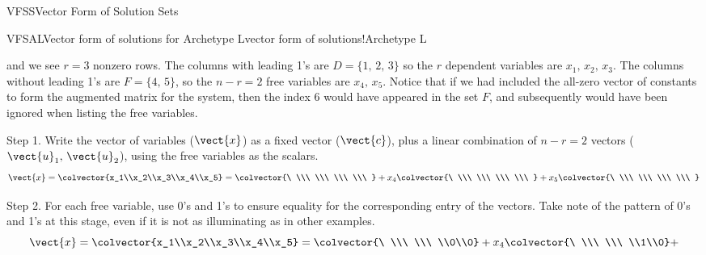\begin{subsect}{VFSS}{Vector Form of Solution Sets}
\begin{example}{VFSAL}{Vector form of solutions for Archetype L}{vector form of solutions!Archetype L}
\begin{para}
\begin{equation*}
\end{equation*}
%
and we see $r=3$ nonzero rows.  The columns with leading 1's are $D=\{1,\,2,\,3\}$ so the $r$ dependent variables are $x_1,\,x_2,\,x_3$.  The columns without leading 1's are $F=\{4,\,5\}$, so the $n-r=2$ free variables are $x_4,\,x_5$.  Notice that if we had included the all-zero vector of constants to form the augmented matrix for the system, then the index 6 would have appeared in the set $F$, and subsequently would have been ignored when listing the free variables.\end{para}
%
\begin{para}Step 1.  Write the vector of variables ($\vect{x}$) as a fixed vector ($\vect{c}$), plus a linear combination of $n-r=2$ vectors ($\vect{u}_1,\,\vect{u}_2$), using the free variables as the scalars.
%
\begin{equation*}
\vect{x}=\colvector{x_1\\x_2\\x_3\\x_4\\x_5}=
\colvector{\ \\\ \\\ \\\ \\\ }+
x_4\colvector{\ \\\ \\\ \\\ \\\ }+
x_5\colvector{\ \\\ \\\ \\\ \\\ }
\end{equation*}
\end{para}
%
\begin{para}Step 2.  For each free variable, use 0's and 1's to ensure equality for the corresponding entry of the vectors.  Take note of the pattern of 0's and 1's at this stage, even if it is not as illuminating as in other examples.
%
\begin{equation*}
\vect{x}=\colvector{x_1\\x_2\\x_3\\x_4\\x_5}=
\colvector{\ \\\ \\\ \\0\\0}+
x_4\colvector{\ \\\ \\\ \\1\\0}+

\end{equation*}
\end{para}
\end{example}
\end{subsect}
